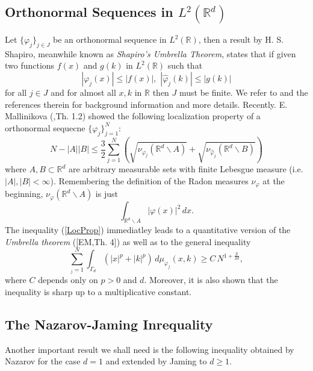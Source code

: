 \documentclass[12pt,a4paper,draft]{article}
\newcommand{\RR}[1]{\mathbb{R}^#1}
\begin{document}
\subsection{Orthonormal Sequences in $L^2(\RR d)$}
Let $\{\varphi_j\}_{j\in J}$ be an orthonormal sequence in $L^2(\mathbb{R})$, then
a result by H. S. Shapiro, meanwhile known as {\sl Shapiro's Umbrella Theorem},
states that if given two functions $f(x)$ and $g(k)$ in $L^2(\mathbb{R})$ such that
\begin{displaymath}
         |\varphi_j(x)| \leq |f(x)|,\,\, |\hat\varphi_j(k)|\leq |g(k)|
\end{displaymath}
for all $j\in J$ and for almost all $x,k$ in $\mathbb{R}$ then $J$ must be
finite. We refer to \cite{jaming:hal-00080455} and the references therein for background information
and more details.
Recently. E. Mallinikova (\cite{malinnikova:2010},Th. 1.2) showed the following localization property of a
orthonormal sequecne $\{\varphi_j\}_{j=1}^N$: 
\begin{equation}\label{LocProp}
                N - |A| |B| \leq \frac{3}{2} \sum_{j=1}^N 
                   \left( \sqrt{\nu_{\varphi_j}({\RR d} \backslash A)} 
                      + \sqrt{\nu_{\hat\varphi_j}({\RR d} \backslash B)}                 
                   \right)
\end{equation}
where $A,B\subset {\RR d}$ are arbitrary measurable sets with finite Lebesgue
measure (i.e. $|A|,|B|<\infty$). Remembering the definition of the Radon measures
$\nu_{\varphi}$ at the beginning, $\nu_{\varphi}({\RR d} \backslash A)$ is
just 
\begin{displaymath}
          \int_{{\RR d} \backslash A} |\varphi(x)|^2\,dx.
\end{displaymath}  
The inequality (\ref{LocProp}) immediatley leads to a quantitative version of the 
{\sl Umbrella theorem} ([EM,Th. 4]) as well as to the general inequality
\begin{equation}
      \sum_{_j=1}^N \int_{\Gamma_d} \left( |x|^p+|k|^p  \right)\, 
               d\mu_{\varphi_j}(x,k) \geq C\, N^{1+\frac{p}{2 d}},
\end{equation} 
where $C$ depends only on $p>0$ and $d$. Moreover, it is also shown that the inequality is sharp up to a multiplicative constant. 
\subsection{The Nazarov-Jaming Inrequality}
Another important result we shall need is the following inequality obtained by
Nazarov for the case $d=1$ and extended by Jaming 
\cite{jaming:hal-00120268} to $d\geq 1$.
\end{document}
